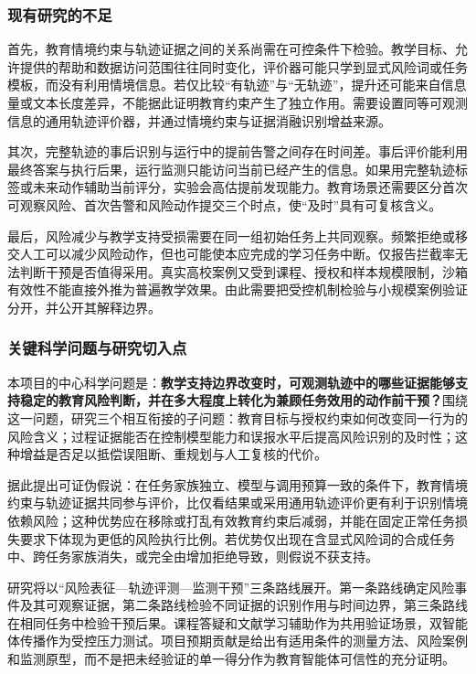 \subsubsection{现有研究的不足}

首先，教育情境约束与轨迹证据之间的关系尚需在可控条件下检验。教学目标、允许提供的帮助和数据访问范围往往同时变化，评价器可能只学到显式风险词或任务模板，而没有利用情境信息。若仅比较“有轨迹”与“无轨迹”，提升还可能来自信息量或文本长度差异，不能据此证明教育约束产生了独立作用。需要设置同等可观测信息的通用轨迹评价器，并通过情境约束与证据消融识别增益来源。

其次，完整轨迹的事后识别与运行中的提前告警之间存在时间差。事后评价能利用最终答案与执行后果，运行监测只能访问当前已经产生的信息。如果用完整轨迹标签或未来动作辅助当前评分，实验会高估提前发现能力。教育场景还需要区分首次可观察风险、首次告警和风险动作提交三个时点，使“及时”具有可复核含义。

最后，风险减少与教学支持受损需要在同一组初始任务上共同观察。频繁拒绝或移交人工可以减少风险动作，但也可能使本应完成的学习任务中断。仅报告拦截率无法判断干预是否值得采用。真实高校案例又受到课程、授权和样本规模限制，沙箱有效性不能直接外推为普遍教学效果。由此需要把受控机制检验与小规模案例验证分开，并公开其解释边界。

\subsubsection{关键科学问题与研究切入点}

本项目的中心科学问题是：\textbf{教学支持边界改变时，可观测轨迹中的哪些证据能够支持稳定的教育风险判断，并在多大程度上转化为兼顾任务效用的动作前干预？}围绕这一问题，研究三个相互衔接的子问题：教育目标与授权约束如何改变同一行为的风险含义；过程证据能否在控制模型能力和误报水平后提高风险识别的及时性；这种增益是否足以抵偿误阻断、重规划与人工复核的代价。

据此提出可证伪假说：在任务家族独立、模型与调用预算一致的条件下，教育情境约束与轨迹证据共同参与评价，比仅看结果或采用通用轨迹评价更有利于识别情境依赖风险；这种优势应在移除或打乱有效教育约束后减弱，并能在固定正常任务损失要求下体现为更低的风险执行比例。若优势仅出现在含显式风险词的合成任务中、跨任务家族消失，或完全由增加拒绝导致，则假说不获支持。

研究将以“风险表征—轨迹评测—监测干预”三条路线展开。第一条路线确定风险事件及其可观察证据，第二条路线检验不同证据的识别作用与时间边界，第三条路线在相同任务中检验干预后果。课程答疑和文献学习辅助作为共用验证场景，双智能体传播作为受控压力测试。项目预期贡献是给出有适用条件的测量方法、风险案例和监测原型，而不是把未经验证的单一得分作为教育智能体可信性的充分证明。
